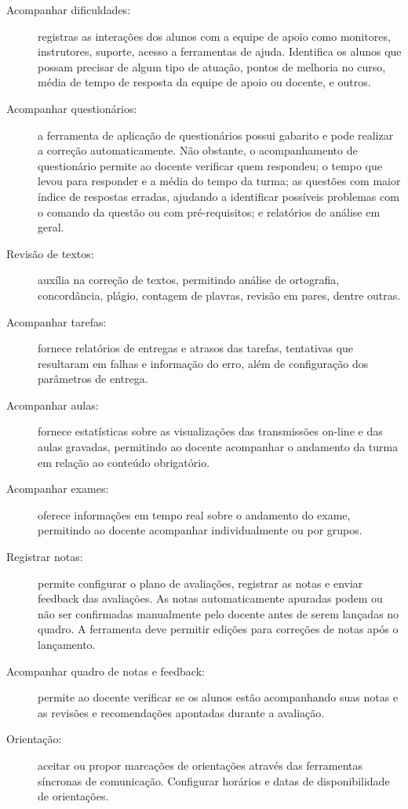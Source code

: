 \begin{description}
\item[Acompanhar dificuldades:] registras as interações dos alunos com a equipe de apoio como monitores, instrutores, suporte, acesso a ferramentas de ajuda. Identifica os alunos que possam precisar de algum tipo de atuação, pontos de melhoria no curso, média de tempo de resposta da equipe de apoio ou docente, e outros. 

\item[Acompanhar questionários:] a ferramenta de aplicação de questionários possui gabarito e pode realizar a correção automaticamente. Não obstante, o acompanhamento de questionário permite ao docente verificar quem respondeu; o tempo que levou para responder e a média do tempo da turma; as questões com maior índice de respostas erradas, ajudando a identificar possíveis problemas com o comando da questão ou com pré-requisitos; e relatórios de análise em geral.

\item[Revisão de textos:] auxília na correção de textos, permitindo análise de ortografia, concordância, plágio, contagem de plavras, revisão em pares, dentre outras.

\item[Acompanhar tarefas:] fornece relatórios de entregas e atrasos das tarefas, tentativas que resultaram em falhas e informação do erro, além de configuração dos parâmetros de entrega.

\item[Acompanhar aulas:] fornece estatísticas sobre as visualizações das transmissões on-line e das aulas gravadas, permitindo ao docente acompanhar o andamento da turma em relação ao conteúdo obrigatório.

\item[Acompanhar exames:] oferece informações em tempo real sobre o andamento do exame, permitindo ao docente acompanhar individualmente ou por grupos. 

\item[Registrar notas:] permite configurar o plano de avaliações, registrar as notas e enviar feedback das avaliações. As notas automaticamente apuradas podem ou não  ser confirmadas manualmente pelo docente antes de serem lançadas no quadro. A ferramenta deve permitir edições para correções de notas após o lançamento.

\item[Acompanhar quadro de notas e feedback:] permite ao docente verificar se os alunos estão acompanhando suas notas e as revisões e recomendações apontadas durante a avaliação.

\item[Orientação:] aceitar ou propor marcações de orientações através das ferramentas síncronas de comunicação. Configurar horários e datas de disponibilidade de orientações.

\end{description}

